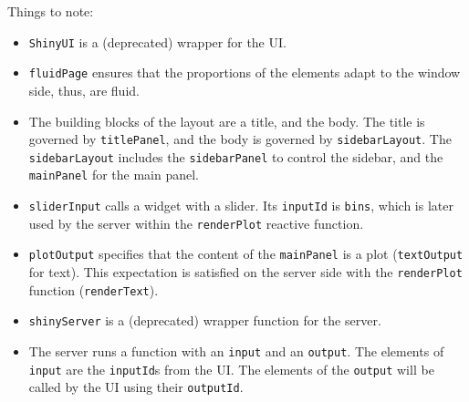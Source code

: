 \documentclass[]{book}
\newenvironment{Shaded}{\begin{snugshade}}{\end{snugshade}}
\newcommand{\KeywordTok}[1]{\textcolor[rgb]{0.13,0.29,0.53}{\textbf{#1}}}
\newcommand{\DataTypeTok}[1]{\textcolor[rgb]{0.13,0.29,0.53}{#1}}
\newcommand{\DecValTok}[1]{\textcolor[rgb]{0.00,0.00,0.81}{#1}}
\newcommand{\StringTok}[1]{\textcolor[rgb]{0.31,0.60,0.02}{#1}}
\newcommand{\CommentTok}[1]{\textcolor[rgb]{0.56,0.35,0.01}{\textit{#1}}}
\newcommand{\ControlFlowTok}[1]{\textcolor[rgb]{0.13,0.29,0.53}{\textbf{#1}}}
\newcommand{\OperatorTok}[1]{\textcolor[rgb]{0.81,0.36,0.00}{\textbf{#1}}}
\newcommand{\NormalTok}[1]{#1}
\providecommand{\tightlist}{%
  \setlength{\itemsep}{0pt}\setlength{\parskip}{0pt}}
\theoremstyle{definition}
\theoremstyle{definition}
\theoremstyle{definition}
\theoremstyle{remark}
\begin{document}
\begin{Shaded}
\end{Shaded}

Things to note:

\begin{itemize}
\tightlist
\item
  \texttt{ShinyUI} is a (deprecated) wrapper for the UI.
\item
  \texttt{fluidPage} ensures that the proportions of the elements adapt
  to the window side, thus, are fluid.
\item
  The building blocks of the layout are a title, and the body. The title
  is governed by \texttt{titlePanel}, and the body is governed by
  \texttt{sidebarLayout}. The \texttt{sidebarLayout} includes the
  \texttt{sidebarPanel} to control the sidebar, and the
  \texttt{mainPanel} for the main panel.
\item
  \texttt{sliderInput} calls a widget with a slider. Its
  \texttt{inputId} is \texttt{bins}, which is later used by the server
  within the \texttt{renderPlot} reactive function.
\item
  \texttt{plotOutput} specifies that the content of the
  \texttt{mainPanel} is a plot (\texttt{textOutput} for text). This
  expectation is satisfied on the server side with the
  \texttt{renderPlot} function (\texttt{renderText}).
\item
  \texttt{shinyServer} is a (deprecated) wrapper function for the
  server.
\item
  The server runs a function with an \texttt{input} and an
  \texttt{output}. The elements of \texttt{input} are the
  \texttt{inputId}s from the UI. The elements of the \texttt{output}
  will be called by the UI using their \texttt{outputId}.
\end{itemize}
\end{document}
